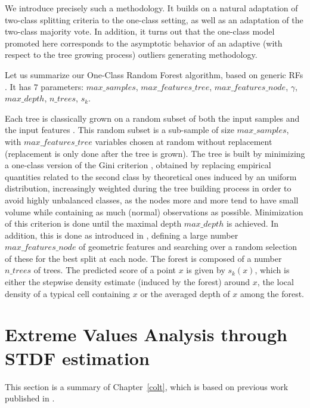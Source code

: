 We introduce precisely such a methodology. It builds on a natural adaptation of two-class %
splitting criteria to the one-class setting, as well as an adaptation of the two-class majority vote.
In addition, it turns out that the one-class model promoted here corresponds to the asymptotic behavior of an adaptive (with respect to the tree growing process) outliers generating methodology.


Let us summarize our One-Class Random Forest algorithm, based on generic RFs \citep{Breiman2001}. It has $7$ parameters:
$max\_samples$, $max\_features\_tree$, $max\_features\_node$, $\gamma$, $max\_depth$, $n\_trees$, $s_k$.

Each tree is classically grown on a random subset of both the input samples and the input features \citep{Ho1998, Panov2007}.
This random subset is a sub-sample of size $max\_samples$, with $max\_features\_tree$ variables chosen at random without replacement (replacement is only done after the tree is grown). The tree is built by minimizing 
a one-class version of the Gini criterion \citep{Gini1912}, obtained by replacing empirical quantities related to the second class by theoretical ones induced by an uniform distribution, increasingly weighted during the tree building process in order to avoid highly unbalanced classes, as the nodes more and more tend to have small volume while containing as much (normal) observations as possible.
%
Minimization of this criterion is done until the maximal depth $max\_depth$ is achieved.
In addition, this is done as introduced in \citep{Amit1997}, defining a large number $max\_features\_node$ of geometric features and searching over a random selection of these for the best split at each node.
%
The forest is composed of a number $n\_trees$ of trees. The predicted score of a point $x$ is given by $s_k(x)$, which is either the stepwise density estimate (induced by the forest) around $x$, the local density of a typical cell containing $x$ or the averaged depth of $x$ among the forest.




\section{Extreme Values Analysis through STDF estimation}
\label{resume:stdf}
This section is a summary of Chapter~\ref{colt}, which is based on previous work published in \cite{COLT15}.

